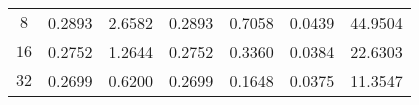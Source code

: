 \documentclass[3p]{elsarticle}
\def\u{\mathbf u}
\def\uone{\mathbf{u}_{1}}
\def\Hdiv{\mathbf{H_{div}}}
\def\poneh{p_{1}^{h}}
\def\ptwoh{p_{2}^{h}}
\def\flux{f_{\bm{\hat{n}} } }
\begin{document}
\begin{example}
\begin{table*}[h!]
\begin{center}
\begin{tabular}{ c c c c c c c }
$ 8 $  &  0.2893  &   2.6582  &  0.2893  &   0.7058   &   0.0439 &  44.9504   \\ 
%
$ 16 $  &  0.2752  &  1.2644  &  0.2752  &  0.3360   &  0.0384  &  22.6303   \\ 
%
$ 32 $  &  0.2699  & 0.6200  &  0.2699   &  0.1648   &  0.0375  &  11.3547   \\ 
%
    \hline
\end{tabular}
\end{center}
%
\end{table*}
%
%
%

\end{example}
\end{document}
